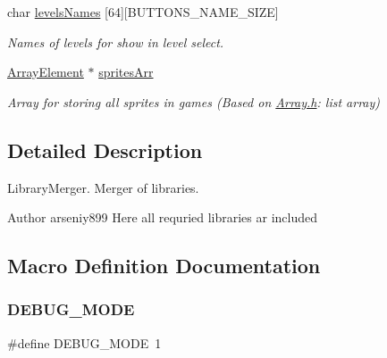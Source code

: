 \begin{DoxyCompactItemize}
\mbox{\label{group___library_merger_gae5cb82a78ca4ac2c20f9d071e7124f38}} 
char \hyperlink{group___library_merger_gae5cb82a78ca4ac2c20f9d071e7124f38}{levels\+Names} \mbox{[}64\mbox{]}\mbox{[}B\+U\+T\+T\+O\+N\+S\+\_\+\+N\+A\+M\+E\+\_\+\+S\+I\+ZE\mbox{]}
\begin{DoxyCompactList}\small\item\em Names of levels for show in level select. \end{DoxyCompactList}\item 
\mbox{\label{group___library_merger_gaff9189abc1a89e6f7704d68d1de9f5ca}} 
\hyperlink{struct_s_array_element}{Array\+Element} $\ast$ \hyperlink{group___library_merger_gaff9189abc1a89e6f7704d68d1de9f5ca}{sprites\+Arr}
\begin{DoxyCompactList}\small\item\em Array for storing all sprites in games (Based on \hyperlink{_array_8h_source}{Array.\+h}\+: list array) \end{DoxyCompactList}\end{DoxyCompactItemize}


\subsection{Detailed Description}
Library\+Merger. Merger of libraries. 

\begin{DoxyAuthor}{Author}
arseniy899 Here all requried libraries ar included 
\end{DoxyAuthor}


\subsection{Macro Definition Documentation}
\mbox{\label{group___library_merger_gac80a3592e72fd96b772ee47a7d8e0d0a}} 
\subsubsection{\texorpdfstring{D\+E\+B\+U\+G\+\_\+\+M\+O\+DE}{DEBUG\_MODE}}
{\footnotesize\ttfamily \#define D\+E\+B\+U\+G\+\_\+\+M\+O\+DE~1}



